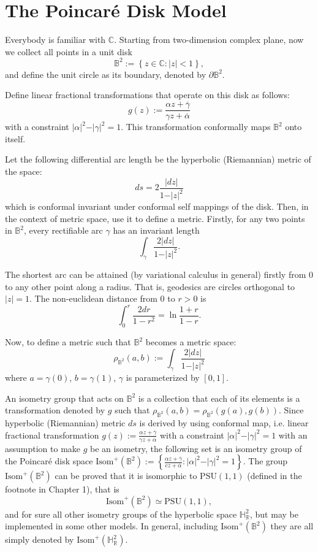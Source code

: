\documentclass[12pt,oneside]{sfsuthesis}
\theoremstyle{plain} %
\theoremstyle{definition}  %
\theoremstyle{remark}  %
\theoremstyle{plain}
\begin{document}
{\section{The Poincar\'{e} Disk Model}

Everybody is familiar with $\mathbb{C}$. Starting from two-dimension complex plane, now we collect all points in a unit disk
$$
\mathbb{B}^2:=\left\lbrace z\in\mathbb{C}:\vert z \vert <1\right\rbrace,
$$
and define the unit circle as its boundary, denoted by $\partial \mathbb{B}^2$. 




Define linear fractional transformations that operate on this disk as follows:
$$
g(z):=\frac{\alpha z+\overline{\gamma}}{\gamma z+\overline{\alpha}}
$$
with a constraint $\vert \alpha\vert^2-\vert \gamma\vert^2=1$. This transformation conformally maps $\mathbb{B}^2$ onto itself.

Let the following differential arc length be the hyperbolic (Riemannian) metric of the space:
$$
ds=2\frac{\vert dz \vert}{1-\vert z\vert^2}
$$
which is conformal invariant under conformal self mappings of the disk\cite{ahlfors2010conformal, stein2010complex}. Then, in the context of metric space, use it to define a metric. Firstly, for any two points in $\mathbb{B}^2$, every rectifiable arc $\gamma$ has an invariant length
$$
\int_\gamma\frac{2\vert dz \vert}{1-\vert z\vert^2}.
$$

The shortest arc can be attained (by variational calculus in general) firstly from $0$ to any other point along a radius. That is, geodesics are circles orthogonal to $\vert z \vert =1$. The non-euclidean distance from $0$ to $r>0$ is
\begin{equation}\label{log}
\int_0^r\frac{2dr}{1-r^2}=\ln\frac{1+r}{1-r}.
\end{equation}

Now, to define a metric such that $\mathbb{B}^2$ becomes a metric space:
$$
\rho_{\mathbb{B}^2}(a,b):=\int_\gamma\frac{2\vert dz \vert}{1-\vert z\vert^2}
$$
where $a=\gamma(0)$, $b=\gamma(1)$, $\gamma$ is parameterized by $[0,1]$.


An isometry group that acts on $\mathbb{B}^2$ is a collection that each of its elements is a transformation denoted by $g$ such that $\rho_{\mathbb{B}^2}(a,b)=\rho_{\mathbb{B}^2}(g(a),g(b)).$ 
Since hyperbolic (Riemannian) metric $ds$ is derived by using conformal map, i.e. linear fractional transformation $g(z):=\frac{\alpha z+\overline{\gamma}}{\gamma z+\overline{\alpha}}$ with a constraint $\vert \alpha\vert^2-\vert \gamma\vert^2=1$ with an assumption to make $g$ be an isometry, the following set is an isometry group of the Poincar\'{e} disk space
$\text{Isom}^+(\mathbb{B}^2):=\left\lbrace \frac{\alpha z+\overline{\gamma}}{cz+\overline{\alpha}}:\vert \alpha \vert^2-\vert \gamma \vert^2=1 \right\rbrace.
$
The group $\text{Isom}^+(\mathbb{B}^2)$ can be proved that it is isomorphic to $\text{PSU}(1,1)$ (defined in the footnote in Chapter 1), that is
$$
\text{Isom}^+(\mathbb{B}^2)\simeq\text{PSU}(1,1),
$$ 
and for sure all other isometry groups of the hyperbolic space $\mathbb{H}^2_\mathbb{R}$, but may be implemented in some other models. In general, including $\text{Isom}^+(\mathbb{B}^2)$ they are all simply denoted by $\text{Isom}^+(\mathbb{H}^2_\mathbb{R})$.

}
\end{document}

